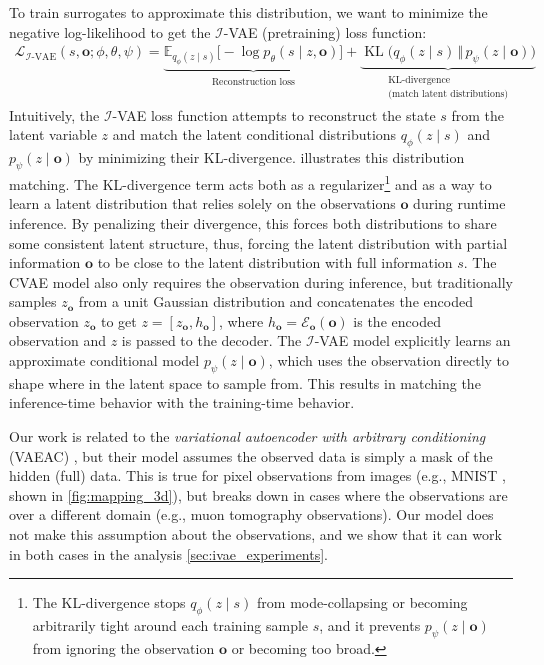 To train surrogates to approximate this distribution, we want to minimize the negative log-likelihood to get the $\mathcal{I}$-VAE (pretraining) loss function:
\begin{align}
    \mathcal{L}_{\mathcal{I}\text{-VAE}}(s, \mathbf{o}; \phi, \theta, \psi) = \displaystyle \underbrace{\mathbb{E}_{q_\phi(z \mid s)} \big[ -\log p_\theta(s \mid z, \mathbf{o}) \big]}_{\substack{\text{Reconstruction loss}}} + \underbrace{\operatorname{KL}\!\big(q_\phi(z \mid s) \,\Vert\, p_\psi(z \mid \mathbf o)\big)}_{\substack{\text{KL-divergence}\\\text{(match latent distributions)}}} \label{eq:ivae_loss}
\end{align}
Intuitively, the $\mathcal{I}$-VAE loss function attempts to reconstruct the state $s$ from the latent variable $z$ and match the latent conditional distributions $q_\phi(z \mid s)$ and $p_\psi(z \mid \mathbf{o})$ by minimizing their KL-divergence.
 illustrates this distribution matching.
The KL-divergence term acts both as a regularizer\footnote{The KL-divergence stops $q_\phi(z \mid s)$ from mode-collapsing or becoming arbitrarily tight around each training sample $s$, and it prevents $p_\psi(z \mid \mathbf{o})$ from ignoring the observation $\mathbf{o}$ or becoming too broad.} \cite{kingma2013vae} and as a way to learn a latent distribution that relies solely on the observations $\mathbf{o}$ during runtime inference.
By penalizing their divergence, this forces both distributions to share some consistent latent structure, thus, forcing the latent distribution with partial information $\mathbf{o}$ to be close to the latent distribution with full information $s$.
The CVAE model also only requires the observation during inference, but traditionally \cite{sohn2015learning,walker2016uncertain,babaeizadeh2018stochastic} samples $z_\mathbf{o}$ from a unit Gaussian distribution and concatenates the encoded observation $z_\mathbf{o}$ to get $z = [z_\mathbf{o}, h_\mathbf{o}]$, where $h_\mathbf{o} = \mathcal{E}_\mathbf{o}(\mathbf{o})$ is the encoded observation and $z$ is passed to the decoder.
The $\mathcal{I}$-VAE model explicitly learns an approximate conditional model $p_\psi(z \mid \mathbf{o})$, which uses the observation directly to shape where in the latent space to sample from.
This results in matching the inference-time behavior with the training-time behavior.

Our work is related to the \textit{variational autoencoder with arbitrary conditioning} (VAEAC) \cite{ivanov2019variational}, but their model assumes the observed data is simply a mask of the hidden (full) data.
This is true for pixel observations from images (e.g., MNIST \cite{lecun1998gradient}, shown in \cref{fig:mapping_3d}), but breaks down in cases where the observations are over a different domain (e.g., muon tomography observations).
Our model does not make this assumption about the observations, and we show that it can work in both cases in the analysis \cref{sec:ivae_experiments}.

